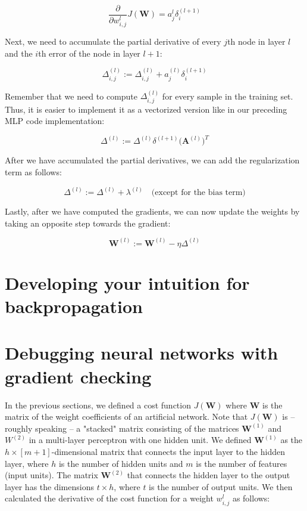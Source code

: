 \documentclass[letterpaper]{report}
\begin{document}
\[
\frac{\partial}{\partial w_{i, j}^{l}} J(\mathbf{W}) = a_{j}^{l} \delta_{i}^{(l+1)}
\]

Next, we need to accumulate the partial derivative of every $j$th node in layer $l$ and the $i$th error of the node in layer $l +1$:

\[
\Delta^{(l)}_{i, j} := \Delta_{i, j}^{(l)} + a_{j}^{(l)} \delta_{i}^{(l+1)}
\]

Remember that we need to compute $\Delta_{i, j}^{(l)}$ for every sample in the training set. Thus, it is easier to implement it as a vectorized version like in our preceding MLP code implementation:

\[
\Delta^{(l)} := \Delta^{(l)} \delta^{(l + 1)} \big( \mathbf{A}^{(l)}  \big)^T 
\]

After we have accumulated the partial derivatives, we can add the regularization term as follows:

\[
\Delta^{(l)} := \Delta^{(l)} + \lambda^{(l)} \quad \text{(except for the bias term)}
\]

Lastly, after we have computed the gradients, we can now update the weights by
taking an opposite step towards the gradient:

\[
\mathbf{W}^{(l)} := \mathbf{W}^{(l)} - \eta\Delta^{(l)} 
\]


\section{Developing your intuition for backpropagation}
\section{Debugging neural networks with gradient checking}

In the previous sections, we defined a cost function $J(\mathbf{W})$ where $\mathbf{W}$ is the matrix
of the weight coefficients of an artificial network. Note that $J(\mathbf{W})$  is -- roughly speaking -- a "stacked" matrix consisting of the matrices $\mathbf{W}^{(1)}	$ and $W^{(2)}$ in a multi-layer perceptron with one hidden unit. We defined $\mathbf{W}^{(1)}$ as the $h \times [m+1]$-dimensional matrix that connects the input layer to the hidden layer, where $h$ is the number of hidden units and $m$ is the number of features (input units). The matrix $\mathbf{W}^{(2)}$ that connects the hidden layer to the output layer has the dimensions $t \times h$, where $t$ is the number of output units. We then calculated the derivative of the cost function for a weight $w_{i, j}^{l}$ as follows:
\end{document}
